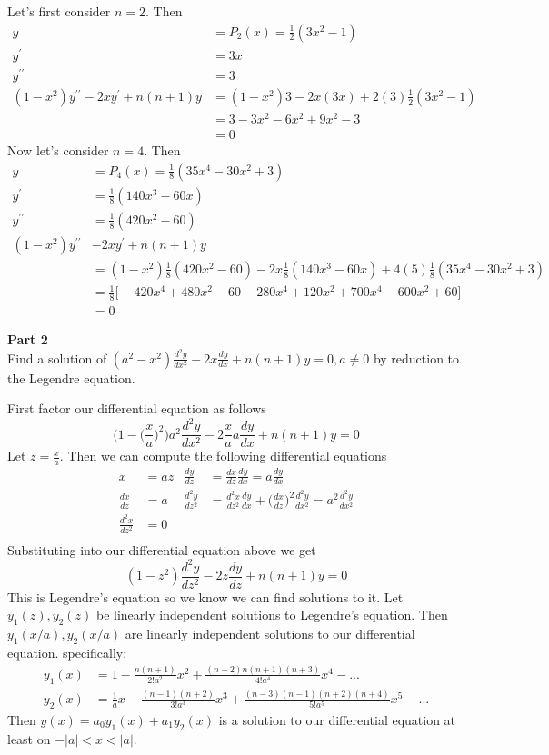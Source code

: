\documentclass[12pt]{article}
\newcommand{\problem}[1]{\hspace{-4 ex} \large \textbf{#1}\\}
\begin{document}
	Let's first consider $n=2$. Then 
	\begin{align*}
		y & = P_2(x) = \frac{1}{2}(3x^2-1) \\
		y^\prime & = 3x \\
		y^{\prime\prime} & = 3 \\
		(1-x^2)y^{\prime\prime} - 2xy^\prime + n(n+1)y & = (1-x^2)3 - 2x(3x) + 2(3)\frac{1}{2}(3x^2-1) \\
		& = 3-3x^2 - 6x^2 + 9x^2-3 \\
		& = 0
	\end{align*}
	Now let's consider $n=4$. Then 
	\begin{align*}
	y & = P_4(x) = \frac{1}{8}(35x^4-30x^2+3) \\
	y^\prime & = \frac{1}{8}(140x^3-60x) \\
	y^{\prime\prime} & = \frac{1}{8}(420x^2-60) \\
	(1-x^2)y^{\prime\prime} &- 2xy^\prime + n(n+1)y \\ 
	& = (1-x^2)\frac{1}{8}(420x^2-60) - 2x\frac{1}{8}(140x^3-60x) + 4(5)\frac{1}{8}(35x^4-30x^2+3) \\
	& = \frac{1}{8} \big[  -420x^4 + 480x^2 - 60 - 280x^4 + 120x^2 +700x^4 - 600x^2 + 60 \big] \\
	& = 0
	\end{align*}
	
\problem{Part 2} Find a solution of $(a^2-x^2)\frac{d^2y}{dx^2} - 2x\frac{dy}{dx} +n(n+1)y = 0, a \neq 0$ by reduction to the Legendre equation.

	First factor our differential equation as follows $$\Big(1-\Big(\frac{x}{a}\Big)^2\Big)a^2\frac{d^2y}{dx^2} - 2\frac{x}{a}a\frac{dy}{dx} +n(n+1)y = 0$$
	Let $z = \frac{x}{a}$. Then we can compute the following differential equations
	\begin{align*}
		x & = az & \frac{dy}{dz} & = \frac{dx}{dz}\frac{dy}{dx}  = a\frac{dy}{dx} \\
		\frac{dx}{dz} & = a & \frac{d^2y}{dz^2} & = \frac{d^2x}{dz^2}\frac{dy}{dx} + \Big(\frac{dx}{dz}\Big)^2 \frac{d^2y}{dx^2} = a^2 \frac{d^2y}{dx^2}\\
		\frac{d^2x}{dz^2} & = 0 & & \\
	\end{align*}
	Substituting into our differential equation above we get $$(1-z^2)\frac{d^2y}{dz^2} - 2z\frac{dy}{dz} +n(n+1)y = 0$$ This is Legendre's equation so we know we can find solutions to it. Let $y_1(z), y_2(z)$ be linearly independent solutions to Legendre's equation. Then $y_1(x/a), y_2(x/a)$ are linearly independent solutions to our differential equation. specifically:
	\begin{align*}
		y_1(x) & = 1 - \frac{n(n+1)}{2!a^2}x^2 + \frac{(n-2)n(n+1)(n+3)}{4!a^4}x^4 - ... \\
		y_2(x) & = \frac{1}{a}x - \frac{(n-1)(n+2)}{3!a^3}x^3 + \frac{(n-3)(n-1)(n+2)(n+4)}{5!a^5}x^5 - ...
	\end{align*}
	Then $y(x) = a_0y_1(x) + a_1y_2(x)$ is a solution to our differential equation at least on $-\vert a \vert <x< \vert a \vert$.
	
\end{document}
